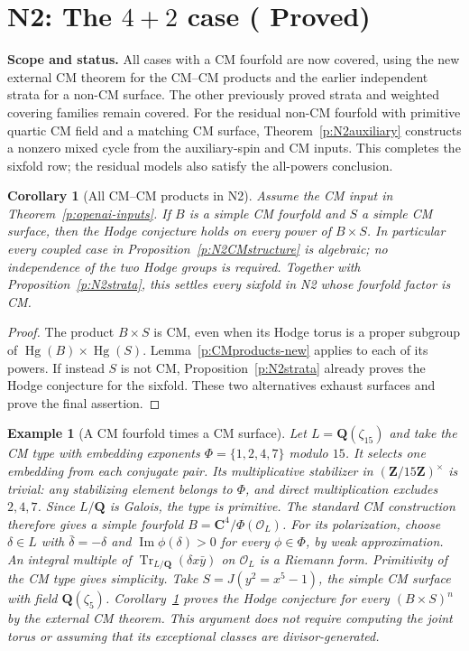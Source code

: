 \documentclass[11pt,reqno]{article}
\theoremstyle{emphasizedplain}
\DeclareRobustCommand{\provedstatus}{%
  \texorpdfstring{\textcolor{ProvedGreen}{\textbf{Proved}}}{Proved}}
\newtheorem{corollary}[theorem]{Corollary}
\theoremstyle{emphasizeddefinition}
\newtheorem{example}[theorem]{Example}
\theoremstyle{emphasizeddefinition}
\DeclareMathOperator{\Hg}{Hg}
\DeclareMathOperator{\Tr}{Tr}
\newcommand{\Q}{\mathbf Q}
\newcommand{\C}{\mathbf C}
\newcommand{\Z}{\mathbf Z}
\newcommand{\status}[1]{%
  \par\nobreak\smallskip\noindent
  {\setlength{\fboxsep}{7pt}%
   \colorbox{ScopeBackground}{%
    \parbox{\dimexpr\linewidth-2\fboxsep\relax}{%
     \small\textbf{\textcolor{HeadingInk}{Scope and status.}} #1}}}%
  \par\nobreak\medskip}
\begin{document}
\section{N2: The \texorpdfstring{$4+2$}{4+2} case (\provedstatus)}\label{sec:N2}

\status{All cases with a CM fourfold are now covered, using the new
external CM theorem for the CM--CM products and the earlier independent
strata for a non-CM surface. The other previously proved strata and
weighted covering families remain covered. For the residual non-CM
fourfold with primitive quartic CM field and a matching CM surface,
Theorem~\ref{p:N2auxiliary} constructs a nonzero mixed cycle from
the auxiliary-spin and CM inputs. This completes the sixfold row;
the residual models also satisfy the all-powers conclusion.}

\begin{corollary}[All CM--CM products in N2]\label{p:N2CM-new}
Assume the CM input in Theorem~\ref{p:openai-inputs}.
If $B$ is a simple CM fourfold and $S$ a simple CM surface, then
the Hodge conjecture holds on every power of $B\times S$.
In particular every coupled case in Proposition~\ref{p:N2CMstructure}
is algebraic; no independence of the two Hodge groups is required.
Together with Proposition~\ref{p:N2strata}, this settles every
sixfold in N2 whose fourfold factor is CM.
\end{corollary}
\begin{proof}
The product $B\times S$ is CM, even when its Hodge torus is a proper
subgroup of $\Hg(B)\times\Hg(S)$.
Lemma~\ref{p:CMproducts-new} applies to each of its powers.
If instead $S$ is not CM, Proposition~\ref{p:N2strata} already
proves the Hodge conjecture for the sixfold. These two alternatives
exhaust surfaces and prove the final assertion.
\end{proof}
\begin{example}[A CM fourfold times a CM surface]\label{ex:N2CM-new}
Let $L=\Q(\zeta_{15})$ and take the CM type with embedding
exponents $\Phi=\{1,2,4,7\}$ modulo $15$.
It selects one embedding from each conjugate pair.
Its multiplicative stabilizer in $(\Z/15\Z)^\times$ is trivial:
any stabilizing element belongs to $\Phi$, and direct multiplication
excludes $2,4,7$. Since $L/\Q$ is Galois, the type is primitive.
The standard CM construction therefore gives a simple fourfold
$B=\C^4/\Phi(\mathcal O_L)$.
For its polarization, choose $\delta\in L$ with
$\bar\delta=-\delta$ and $\operatorname{Im}\phi(\delta)>0$
for every $\phi\in\Phi$, by weak approximation.
An integral multiple of $\Tr_{L/\Q}(\delta x\bar y)$ on
$\mathcal O_L$ is a Riemann form. Primitivity of the CM type
gives simplicity.
Take $S=J(y^2=x^5-1)$, the simple CM surface with field
$\Q(\zeta_5)$. Corollary~\ref{p:N2CM-new} proves the Hodge
conjecture for every $(B\times S)^n$ by the external CM theorem.
This argument does not require computing the joint torus or assuming
that its exceptional classes are divisor-generated.
\end{example}
\end{document}
